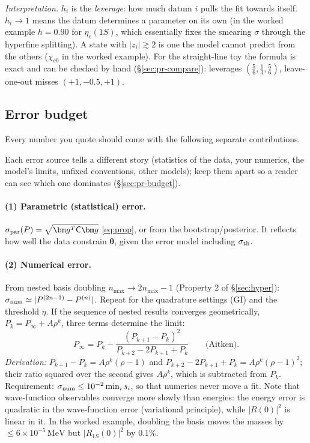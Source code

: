 \documentclass[11pt,a4paper]{article}
\numberwithin{equation}{section}
\theoremstyle{definition}
\theoremstyle{plain}
\theoremstyle{remark}
\newenvironment{plainwords}[1][In plain words]{\begin{tcolorbox}[plainbox,title={\small\bfseries #1},fonttitle=\small,coltitle=white,colbacktitle=ForestGreen!60!black]}{\end{tcolorbox}}
\numberwithin{algorithm}{section}
\newcommand{\MeV}{\,\mathrm{MeV}}
\newcommand{\sC}{\mathsf C}
\newcommand{\vth}{\bm\theta}
\newcommand{\vg}{\bm g}
\begin{document}
\emph{Interpretation.} $h_i$ is the \emph{leverage}: how much datum $i$ pulls the fit towards itself. $h_i\to1$ means the datum determines a parameter on its own (in the worked example $h=0.90$ for $\eta_c(1S)$, which essentially fixes the smearing $\sigma$ through the hyperfine splitting). A state with $|z_i|\gtrsim2$ is one the model cannot predict from the others ($\chi_{c0}$ in the worked example).
For the straight-line toy the formula is exact and can be checked by hand (\S\ref{sec:pr-compare}): leverages $(\frac56,\frac13,\frac56)$, leave-one-out misses $(+1,-0.5,+1)$.

\subsection{Error budget}\label{sec:errors}
Every number you quote should come with the following separate contributions.
\begin{plainwords}[In plain words]
Each error source tells a different story (statistics of the data, your numerics, the model's limits, unfixed conventions, other models); keep them apart so a reader can see which one dominates (\S\ref{sec:pr-budget}).
\end{plainwords}

\paragraph{(1) Parametric (statistical) error.} $\sigma_{\rm par}(P)=\sqrt{\vg^T\sC\vg}$ \eqref{eq:prop}, or from the bootstrap/posterior. It reflects how well the data constrain $\vth$, given the error model including $\sigma_{\rm th}$.

\paragraph{(2) Numerical error.} From nested basis doubling $n_{\max}\to2n_{\max}-1$ (Property 2 of \S\ref{sec:hyper}): $\sigma_{\rm num}\simeq|P^{(2n-1)}-P^{(n)}|$. Repeat for the quadrature settings (GI) and the threshold $\eta$. If the sequence of nested results converges geometrically, $P_k=P_\infty+A\rho^k$, three terms determine the limit:
\begin{equation}
P_\infty=P_k-\frac{(P_{k+1}-P_k)^2}{P_{k+2}-2P_{k+1}+P_k}\qquad\text{(Aitken)}.
\end{equation}
\emph{Derivation:} $P_{k+1}-P_k=A\rho^k(\rho-1)$ and $P_{k+2}-2P_{k+1}+P_k=A\rho^k(\rho-1)^2$; their ratio squared over the second gives $A\rho^k$, which is subtracted from $P_k$.
Requirement: $\sigma_{\rm num}\le10^{-2}\min_i s_i$, so that numerics never move a fit. Note that wave-function observables converge more slowly than energies: the energy error is quadratic in the wave-function error (variational principle), while $|R(0)|^2$ is linear in it. In the worked example, doubling the basis moves the masses by $\le6\times10^{-5}\MeV$ but $|R_{1S}(0)|^2$ by $0.1\%$.
\end{document}
